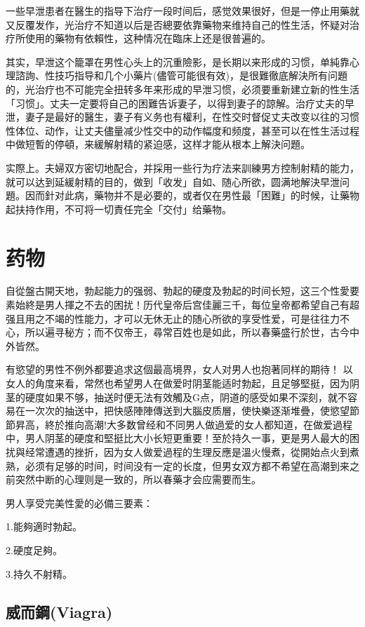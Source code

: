\documentclass[12pt,UTF8]{ctexbook}
\begin{document}
一些早泄患者在醫生的指导下治疗一段时间后，感觉效果很好，但是一停止用藥就又反覆发作，光治疗不知道以后是否總要依靠藥物来维持自己的性生活，怀疑对治疗所使用的藥物有依賴性，这种情况在臨床上还是很普遍的。

其实，早泄这个籠罩在男性心头上的沉重險影，是长期以来形成的习惯，单純靠心理諮詢、性技巧指导和几个小藥片(儘管可能很有效)，是很難徹底解決所有问題的，光治疗也不可能完全扭转多年来形成的早泄习惯，必须要重新建立新的性生活「习惯」。丈夫一定要将自己的困難告诉妻子，以得到妻子的諒解。治疗丈夫的早泄，妻子是最好的醫生，妻子有义务也有權利，在性交时督促丈夫改变以往的习惯性体位、动作，让丈夫儘量减少性交中的动作幅度和频度，甚至可以在性生活过程中做短暫的停頓，来緩解射精的紧迫感，这样才能从根本上解決问題。

实際上。夫婦双方密切地配合，并採用一些行为疗法来訓練男方控制射精的能力，就可以达到延緩射精的目的，做到「收发」自如、随心所欲，圆满地解決早泄问題。因而針对此病，藥物并不是必要的，或者仅在男性最「困難」的时候，让藥物起扶持作用，不可将一切責任完全「交付」给藥物。

\chapter{药物}

自從盤古開天地，勃起能力的强弱、勃起的硬度及勃起的时间长短，这三个性愛要素始終是男人揮之不去的困扰！历代皇帝后宫佳麗三千，每位皇帝都希望自己有超强且用之不竭的性能力，才可以无休无止的随心所欲的享受性爱，可是往往力不心，所以遍寻秘方；而不仅帝王，尋常百姓也是如此，所以春藥盛行於世，古今中外皆然。

有慾望的男性不例外都要追求这個最高境界，女人对男人也抱著同样的期待！
以女人的角度来看，常然也希望男人在做爱时阴茎能适时勃起，且足够堅挺，因为阴茎的硬度如果不够，抽送时便无法有效觸及G点，阴道的感受如果不深刻，就不容易在一次次的抽送中，把快感陣陣傳送到大腦皮质層，使快樂逐渐堆疊，使慾望節節昇高，終於推向高潮!大多数曾经和不同男人做過爱的女人都知道，在做爱過程中，男人阴茎的硬度和堅挺比大小长短更重要！至於持久一事，更是男人最大的困扰與经常遭遇的挫折，因为女人做爱過程的生理反應是溫火慢煮，從開始点火到煮熟，必须有足够的时间，时间没有一定的长度，但男女双方都不希望在高潮到来之前突然中断的心理则是一致的，所以春藥才会应需要而生。

男人享受完美性愛的必備三要素：

1.能夠適时勃起。

2.硬度足夠。

3.持久不射精。

\section{威而鋼(Viagra)}
\end{document}
